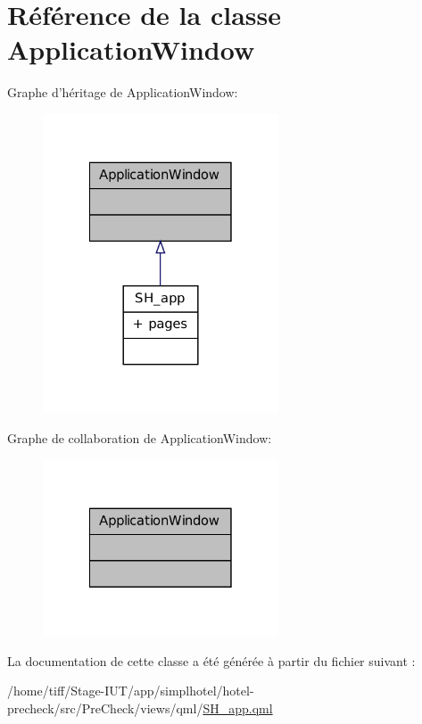 \hypertarget{classApplicationWindow}{\section{Référence de la classe Application\-Window}
\label{classApplicationWindow}
}


Graphe d'héritage de Application\-Window\-:\nopagebreak
\begin{figure}[H]
\begin{center}
\leavevmode
\includegraphics[width=198pt]{classApplicationWindow__inherit__graph}
\end{center}
\end{figure}


Graphe de collaboration de Application\-Window\-:\nopagebreak
\begin{figure}[H]
\begin{center}
\leavevmode
\includegraphics[width=198pt]{classApplicationWindow__coll__graph}
\end{center}
\end{figure}


La documentation de cette classe a été générée à partir du fichier suivant \-:\begin{DoxyCompactItemize}
\item 
/home/tiff/\-Stage-\/\-I\-U\-T/app/simplhotel/hotel-\/precheck/src/\-Pre\-Check/views/qml/\hyperlink{SH__app_8qml}{S\-H\-\_\-app.\-qml}\end{DoxyCompactItemize}
